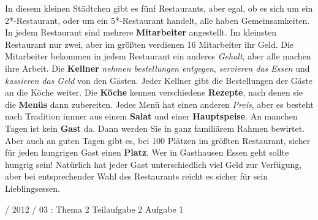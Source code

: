 \documentclass{lehramt-informatik-haupt}
\begin{document}
\begin{enumerate}
In diesem kleinen Städtchen gibt es fünf Restaurants, aber egal, ob es
sich um ein 2*-Restaurant, oder um ein 5*-Restaurant handelt, alle haben
Gemeinsamkeiten. In jedem Restaurant sind mehrere \textbf{Mitarbeiter}
angestellt. Im kleinsten Restaurant nur zwei, aber im größten verdienen
16 Mitarbeiter ihr Geld. Die Mitarbeiter bekommen in jedem Restaurant
ein anderes \emph{Gehalt}, aber alle machen ihre Arbeit. Die
\textbf{Kellner}
\emph{nehmen bestellungen entgegen}, \emph{servieren das Essen} und \emph{kassieren das Geld}
von den Gästen. Jeder Kellner gibt die Bestellungen der Gäste an die
Köche weiter. Die \textbf{Köche} kennen verschiedene \textbf{Rezepte},
nach denen sie die \textbf{Menüs} dann zubereiten. Jedes Menü hat einen
anderen \emph{Preis}, aber es besteht nach Tradition immer aus einem
\textbf{Salat} und einer \textbf{Hauptspeise}. An manchen Tagen ist kein
\textbf{Gast} da. Dann werden Sie in ganz familiärem Rahmen bewirtet.
Aber auch an guten Tagen gibt es, bei 100 Plätzen im größten Restaurant,
sicher für jeden hungrigen Gast einen \textbf{Platz}. Wer in Gasthausen
Essen geht sollte hungrig sein! Natürlich hat jeder Gast unterschiedlich
viel Geld zur Verfügung, aber bei entsprechender Wahl des Restaurants
reicht es sicher für sein Lieblingsessen.


\end{enumerate}

%

 / 2012 / 03 : Thema 2 Teilaufgabe 2 Aufgabe 1

\literatur
\end{document}
